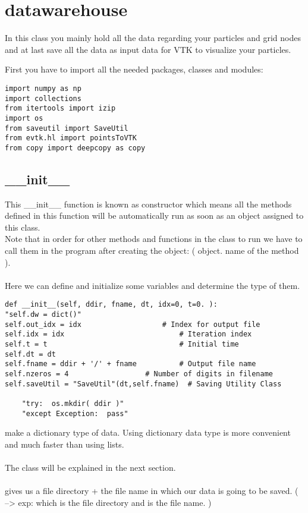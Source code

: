 \documentclass[11pt,fleqn]{book} %
\begin{document}
\chapter{datawarehouse}
\label{chap:datawarehouse}
In this class you mainly hold all the data regarding your particles and grid nodes and at last save all the data as input data for VTK to visualize your particles.

First you have to import all the needed packages, classes and modules:
\begin{lstlisting}
import numpy as np
import collections
from itertools import izip
import os
from saveutil import SaveUtil
from evtk.hl import pointsToVTK
from copy import deepcopy as copy
\end{lstlisting}
\section{\_\_init\_\_}
This \_\_init\_\_ function is known as constructor which means all the methods defined in this function will be automatically run as soon as an object assigned to this class. \\
Note that in order for other methods and functions in the class to run we have to call them in the program after creating the object: ( object. name of the method ). \\ \\
Here we can define and initialize some variables and determine the type of them. 
\begin{lstlisting}
def __init__(self, ddir, fname, dt, idx=0, t=0. ):
"self.dw = dict()"
self.out_idx = idx                   # Index for output file
self.idx = idx                           # Iteration index
self.t = t                               # Initial time
self.dt = dt
self.fname = ddir + '/' + fname          # Output file name
self.nzeros = 4                  # Number of digits in filename
self.saveUtil = "SaveUtil"(dt,self.fname)  # Saving Utility Class
	
	"try:  os.mkdir( ddir )"	    
	"except Exception:  pass"	
\end{lstlisting}
 make a dictionary type of data. Using dictionary data type is more convenient and much faster than using lists.\\ \\ 
The  class will be explained in the next section.\\ \\
 gives us a file directory + the file name in which our data is going to be saved. ( --> exp:  which  is the file directory and  is the file name. )
\end{document}
